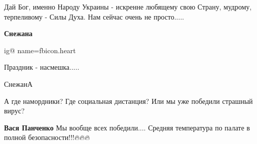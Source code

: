 \begin{itemize}

Дай Бог, именно Народу Украины - искренне любящему свою Страну, мудрому,
терпеливому - Силы Духа. Нам сейчас очень не просто.....


 

\textbf{Снежана} 

\ifcmt
  ig@ name=fbicon.heart
\fi

 
Праздник - насмешка.....

 
СнежанА \Laughey[1.0][white]

 
А где намордники? Где социальная дистанция? Или мы уже победили страшный вирус?

\begin{itemize}
 
\textbf{Вася Панченко} Мы вообще всех победили....
Средняя температура по палате в полной безопасности!!!🔥🔥🔥
\end{itemize}

 

\end{itemize}
